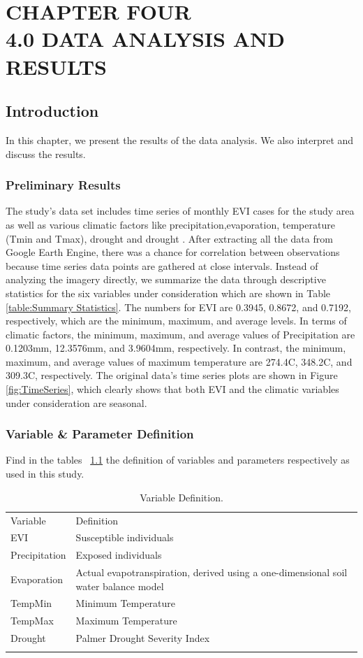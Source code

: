 
\chapter{CHAPTER FOUR\\4.0 DATA ANALYSIS AND RESULTS} %
\section{Introduction}
In this chapter, we present the results of the data analysis. We also interpret and discuss the results. 

\subsection{Preliminary Results}
The study's data set includes time series of monthly EVI cases for the study area as well as various climatic factors like precipitation,evaporation, temperature (Tmin and Tmax), drought and drought . After extracting all the data from  Google Earth Engine, there was a chance for correlation between observations because time series data points are gathered at close intervals. Instead of analyzing the imagery directly, we  summarize the data through descriptive statistics for the six variables under consideration which are shown in Table \ref{table:Summary Statistics}. The numbers for EVI are 0.3945, 0.8672, and 0.7192, respectively, which are the minimum, maximum, and average levels. In terms of climatic factors, the minimum, maximum, and average values of Precipitation are 0.1203mm, 12.3576mm, and 3.9604mm, respectively. In contrast, the minimum, maximum, and average values of maximum temperature are 274.4C, 348.2C, and 309.3C, respectively. The original data's time series plots are shown in Figure \ref{fig:TimeSeries}, which clearly shows that both EVI and the climatic variables under consideration are seasonal. 
\subsection{Variable \& Parameter Definition}
Find in the tables ~\ref{label:Variable}  the definition of variables and parameters respectively as used in this study. 
\begin{table}
	\label{label:Variable}
	\caption{Variable Definition.}
	\centering
	\begin{tabularx}{\textwidth}{ll}
		\hline\noalign{\smallskip}
		Variable & Definition \\ 
		\noalign{\smallskip}\hline\noalign{\smallskip}
	     EVI          & Susceptible individuals \\  
		Precipitation & Exposed individuals \\ 
		Evaporation   & Actual evapotranspiration, derived using a one-dimensional soil water balance model\\ 
		TempMin       & Minimum Temperature \\ 
		TempMax       & Maximum Temperature \\
		Drought       &Palmer Drought Severity Index\\
		\hline\noalign{\smallskip}
	\end{tabularx}
\end{table}
